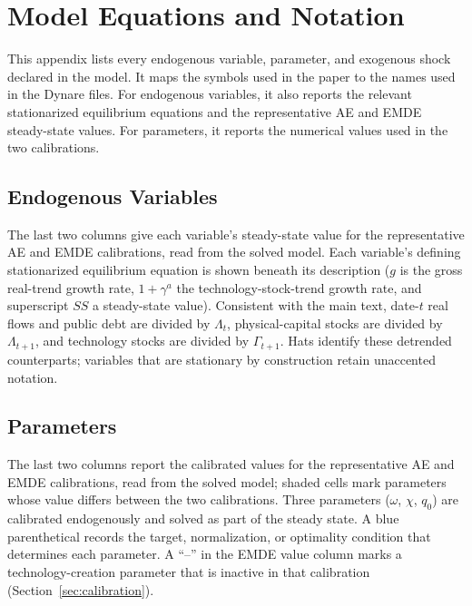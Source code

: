 \documentclass[a4paper,11pt]{article}
\begin{document}
\clearpage
\section{Model Equations and Notation} \label{app:glossary}

This appendix lists every endogenous variable, parameter, and exogenous shock declared in the model.
It maps the symbols used in the paper to the names used in the Dynare files.
For endogenous variables, it also reports the relevant stationarized equilibrium equations and the representative AE and EMDE steady-state values.
For parameters, it reports the numerical values used in the two calibrations.

\subsection{Endogenous Variables}

The last two columns give each variable's steady-state value for the representative AE and EMDE calibrations, read from the solved model.
Each variable's defining stationarized equilibrium equation is shown beneath its description ($g$ is the gross real-trend growth rate, $1+\gamma^{a}$ the technology-stock-trend growth rate, and superscript $SS$ a steady-state value).
Consistent with the main text, date-$t$ real flows and public debt are divided by $\Lambda_t$, physical-capital stocks are divided by $\Lambda_{t+1}$, and technology stocks are divided by $\Gamma_{t+1}$.
Hats identify these detrended counterparts; variables that are stationary by construction retain unaccented notation.



\subsection{Parameters}

The last two columns report the calibrated values for the representative AE and EMDE calibrations, read from the solved model; \colorbox{diffcell}{shaded} cells mark parameters whose value differs between the two calibrations.
Three parameters ($\omega$, $\chi$, $q_0$) are calibrated endogenously and solved as part of the steady state.
A \textcolor{targetblue}{blue parenthetical} records the target, normalization, or optimality condition that determines each parameter.
A ``--'' in the EMDE value column marks a technology-creation parameter that is inactive in that calibration (Section~\ref{sec:calibration}).
\end{document}
